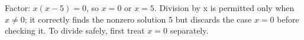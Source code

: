 Factor: $x(x-5)=0$, so $\boxed{x=0\text{ or }x=5}$. Division by x is permitted only when $x\ne 0$; it correctly finds the nonzero solution 5 but discards the case $x=0$ before checking it. To divide safely, first treat $x=0$ separately.
